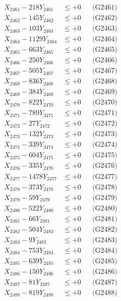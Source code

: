 \documentclass[a4paper,10pt]{article}
\begin{document}
{\begin{align}
\allowbreak
X_{2461} - 218Y_{2461} &\leq +0 && \text{(G2461)} \\
X_{2462} - 145Y_{2462} &\leq +0 && \text{(G2462)} \\
X_{2463} - 103Y_{2463} &\leq +0 && \text{(G2463)} \\
X_{2464} - 1129Y_{2464} &\leq +0 && \text{(G2464)} \\
X_{2465} - 663Y_{2465} &\leq +0 && \text{(G2465)} \\
X_{2466} - 250Y_{2466} &\leq +0 && \text{(G2466)} \\
X_{2467} - 505Y_{2467} &\leq +0 && \text{(G2467)} \\
X_{2468} - 836Y_{2468} &\leq +0 && \text{(G2468)} \\
X_{2469} - 384Y_{2469} &\leq +0 && \text{(G2469)} \\
X_{2470} - 822Y_{2470} &\leq +0 && \text{(G2470)} \\
\allowbreak
X_{2471} - 789Y_{2471} &\leq +0 && \text{(G2471)} \\
X_{2472} - 27Y_{2472} &\leq +0 && \text{(G2472)} \\
X_{2473} - 132Y_{2473} &\leq +0 && \text{(G2473)} \\
X_{2474} - 339Y_{2474} &\leq +0 && \text{(G2474)} \\
X_{2475} - 604Y_{2475} &\leq +0 && \text{(G2475)} \\
X_{2476} - 335Y_{2476} &\leq +0 && \text{(G2476)} \\
X_{2477} - 1478Y_{2477} &\leq +0 && \text{(G2477)} \\
X_{2478} - 373Y_{2478} &\leq +0 && \text{(G2478)} \\
X_{2479} - 59Y_{2479} &\leq +0 && \text{(G2479)} \\
X_{2480} - 522Y_{2480} &\leq +0 && \text{(G2480)} \\
\allowbreak
X_{2481} - 66Y_{2481} &\leq +0 && \text{(G2481)} \\
X_{2482} - 504Y_{2482} &\leq +0 && \text{(G2482)} \\
X_{2483} - 9Y_{2483} &\leq +0 && \text{(G2483)} \\
X_{2484} - 753Y_{2484} &\leq +0 && \text{(G2484)} \\
X_{2485} - 639Y_{2485} &\leq +0 && \text{(G2485)} \\
X_{2486} - 150Y_{2486} &\leq +0 && \text{(G2486)} \\
X_{2487} - 81Y_{2487} &\leq +0 && \text{(G2487)} \\
X_{2488} - 819Y_{2488} &\leq +0 && \text{(G2488)} \\

\end{align}}
\end{document}
